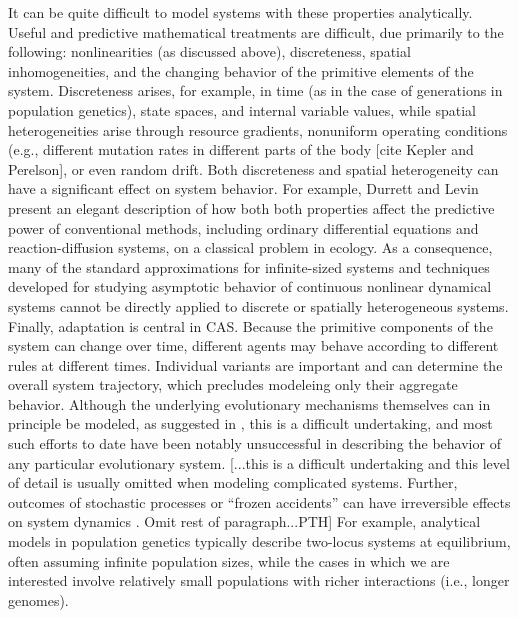 It can be quite difficult to model systems with these properties
analytically.  Useful and predictive mathematical treatments are
difficult, due primarily to the following: nonlinearities (as
discussed above), discreteness, spatial inhomogeneities, and the
changing behavior of the primitive elements of the system.
Discreteness arises, for example, in time (as in the case of
generations in population genetics), state spaces, and internal
variable values, while spatial heterogeneities arise through resource
gradients, nonuniform operating conditions (e.g., different mutation
rates in different parts of the body [cite Kepler and Perelson], or
even random drift.  Both discreteness and spatial heterogeneity can
have a significant effect on system behavior.  For example, Durrett
and Levin \cite{DurrettAndLevin93a} present an elegant description of
how both both properties affect the predictive power of conventional
methods, including ordinary differential equations and
reaction-diffusion systems, on a classical problem in ecology.  As a
consequence, many of the standard approximations for infinite-sized
systems and techniques developed for studying asymptotic behavior of
continuous nonlinear dynamical systems cannot be directly applied to
discrete or spatially heterogeneous systems.  Finally, adaptation is
central in CAS\@.  Because the primitive components of the system can
change over time, different agents may behave according to different
rules at different times.  Individual variants are important and can
determine the overall system trajectory, which precludes modeleing
only their aggregate behavior.  Although the underlying evolutionary
mechanisms themselves can in principle be modeled, as suggested in
\cite{Farmer90}, this is a difficult undertaking, and most such
efforts to date have been notably unsuccessful in describing the
behavior of any particular evolutionary system.
[...this is a difficult undertaking and this level of detail is
usually omitted when modeling complicated systems.  Further, outcomes
of stochastic processes or ``frozen accidents'' can have irreversible
effects on system dynamics \cite{GellMann94,GellMann95}.  Omit rest
of paragraph...PTH] 
For example, analytical models in population genetics typically
describe two-locus systems at equilibrium, often assuming infinite
population sizes, while the cases in which we are interested involve
relatively small populations with richer interactions (i.e., longer
genomes).

